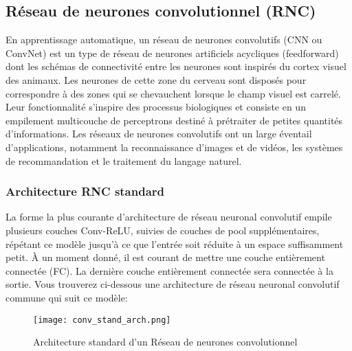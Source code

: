     \subsection{Réseau de neurones convolutionnel (RNC)}
    En apprentissage automatique, un réseau de neurones convolutifs (CNN ou ConvNet) est un type de réseau de neurones artificiels acycliques (feedforward) dont les schémas de connectivité entre les neurones sont inspirés du cortex visuel des animaux. Les neurones de cette zone du cerveau sont disposés pour correspondre à des zones qui se chevauchent lorsque le champ visuel est carrelé. Leur fonctionnalité s'inspire des processus biologiques et consiste en un empilement multicouche de perceptrons destiné à prétraiter de petites quantités d'informations. Les réseaux de neurones convolutifs ont un large éventail d'applications, notamment la reconnaissance d'images et de vidéos, les systèmes de recommandation et le traitement du langage naturel.

        \subsubsection{Architecture RNC standard}
        La forme la plus courante d'architecture de réseau neuronal convolutif empile plusieurs couches Conv-ReLU, suivies de couches de pool supplémentaires, répétant ce modèle jusqu'à ce que l'entrée soit réduite à un espace  suffisamment petit. À un moment donné, il est courant de mettre une couche entièrement connectée (FC). La dernière couche entièrement connectée sera connectée à la sortie. Vous trouverez ci-dessous une architecture de réseau neuronal convolutif commune qui suit ce modèle:

        \begin{figure}[H] 
            \centering
            \texttt{[image: conv\_stand\_arch.png]}
            \caption{Architecture standard d'un Réseau de neurones convolutionnel}
            \label{fig:conv_stand_arch}
        \end{figure}

